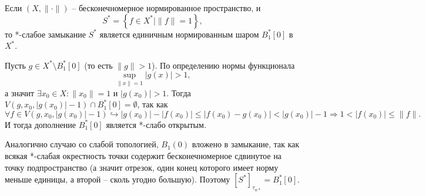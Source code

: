 \begin{note}
    Если $(X, \|\cdot\|)$ -- бесконечномерное нормированное пространство, и
    \[
        S^* = \left\{f \in X^* \mid \|f\| = 1\right\},
    \]
    то *-слабое замыкание $S^*$ является единичным нормированным шаром $B_1^*[0]$ в $X^*$.

    Пусть $g \in X^* \setminus B_1^*[0]$ (то есть $\|g\| > 1$).
    По определению нормы функционала
    \[
        \sup_{\|x\| = 1} |g(x)| > 1,
    \]
    а значит $\exists x_0 \in X\colon \|x_0\| = 1$ и $|g(x_0)| > 1$.
    Тогда $V(g, x_0, |g(x_0)| - 1) \cap B_1^*[0] = \emptyset$, так как
    \[
        \forall f \in V(g, x_0, |g(x_0)| - 1) \hookrightarrow |g(x_0)| - |f(x_0)| \leq |f(x_0) - g(x_0)| < |g(x_0)| - 1 \Rightarrow 1 < |f(x_0)| \leq \|f\|.
    \]
    И тогда дополнение $B_1^*[0]$ является *-слабо открытым.

    Аналогично случаю со слабой топологией, $B_1(0)$ вложено в замыкание, так как всякая *-слабая окрестность точки содержит бесконечномерное сдвинутое на точку подпространство (а значит отрезок, один конец которого имеет норму меньше единицы, а второй -- сколь угодно большую).
    Поэтому $[S^*]_{\tau_{w*}} = B_1^*[0]$.
\end{note}

